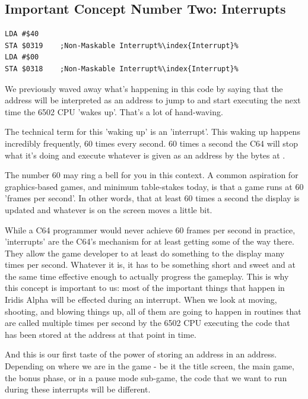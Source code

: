 \subsection{Important Concept Number Two: Interrupts}
\begin{lstlisting}[caption=It's an interrupt\index{interrupt}. And it's non-maskable.,escapechar=\%]
LDA #$40
STA $0319    ;Non-Maskable Interrupt%\index{Interrupt}%
LDA #$00
STA $0318    ;Non-Maskable Interrupt%\index{Interrupt}%
\end{lstlisting}

We previously waved away what's happening in this code by saying that the address  will be interpreted
as an address to jump to and start executing the next time the 6502 CPU 'wakes up'. That's a lot of hand-waving.

The technical term for this 'waking up' is an 'interrupt'. This waking up happens incredibly frequently, 60 times every second.
60 times a second the C64 will stop what it's doing and execute whatever is given as an address by the bytes at .

The number 60 may ring a bell for you in this context. A common aspiration for graphics-based games, and minimum table-stakes today,
is that a game runs at 60 'frames per second'. In other words, that at least 60 times a second the display is updated and whatever
is on the screen moves a little bit.

While a C64 programmer would never achieve 60 frames per second in practice, 'interrupts' are the C64's mechanism for at least
getting some of the way there. They allow the game developer to at least do something to the display many times per second.
Whatever it is, it has to be something short and sweet and at the same time effective enough to actually progress the gameplay.
This is why this concept is important to us: most of the important things that happen in Iridis Alpha will be effected during
an interrupt. When we look at moving, shooting, and blowing things up, all of them are going to happen in routines that are called
multiple times per second by the 6502 CPU executing the code that has been stored at the address  at that
point in time.

And this is our first taste of the power of storing an address in an address. Depending on where we are in the game - be it the
title screen, the main game, the bonus phase, or in a pause mode sub-game, the code that we want to run during these interrupts
will be different.

